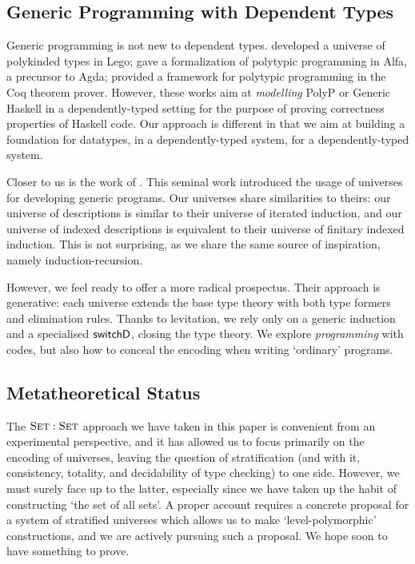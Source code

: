 \subsection{Generic Programming with Dependent Types}

Generic programming is not new to dependent
types. \citet{DBLP:conf/ifip2-1/AltenkirchM02} developed a universe
of polykinded types in Lego;
\citet{norell:msc-thesis} gave a formalization of
polytypic programming in Alfa, a precursor to Agda;
\citet{verbruggen:polytype-prog-coq, verbruggen:polytype-coq} provided
a framework for polytypic programming in the Coq theorem
prover. However, these works aim at \emph{modelling} PolyP or Generic
Haskell in a dependently-typed setting for the purpose of proving
correctness properties of Haskell code. Our approach is different in
that we aim at building a foundation for datatypes, in a
dependently-typed system, for a dependently-typed system.

Closer to us is the work of \citet{benke:universe-generic-prog}. This
seminal work introduced the usage of universes for developing generic
programs. Our universes share similarities to theirs: our universe of
descriptions is similar to their universe of iterated induction, and
our universe of indexed descriptions is equivalent to their universe
of finitary indexed induction. This is not surprising, as we share the
same source of inspiration, namely induction-recursion.

However, we feel ready to offer a more radical prospectus. Their
approach is generative: each universe extends the base type theory
with both type formers and elimination rules. Thanks to levitation, we
rely only on a generic induction and a specialised $\SYMBswitchD$,
closing the type theory. We explore \emph{programming} with codes, but
also how to conceal the encoding when writing `ordinary' programs.


\subsection{Metatheoretical Status}

The \(\Set:\Set\) approach we have taken in this paper is convenient
from an experimental perspective, and it has allowed us to focus
primarily on the encoding of universes, leaving the question
of stratification (and with it, consistency, totality,
and decidability of type checking) to one side. However, we must
surely face up to the latter, especially since we have taken up the
habit of constructing `the set of all sets'. A proper account requires
a concrete proposal for a system of stratified universes which allows
us to make `level-polymorphic' constructions, and we are actively
pursuing such a proposal. We hope soon to have something to prove.

